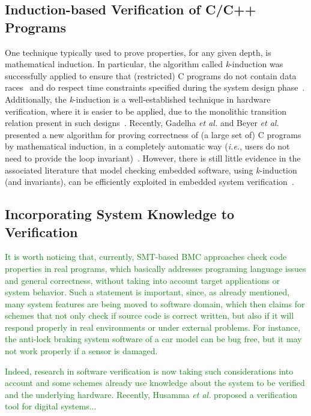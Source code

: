 \documentclass{acm_sen_article}
\begin{document}
\subsection{Induction-based Verification of C/C++ Programs}

One technique typically used to prove properties, for any given depth, is mathematical induction. In particular, the algorithm called \textit{k}-induction was successfully applied to ensure that (restricted) C programs do not contain data races~\cite{Donaldson10,Kinductor} and do respect time constraints specified during the system design phase~\cite{EenS03}. Additionally, the \textit{k}-induction is a well-established technique in hardware verification, where it is easier to be applied, due to the monolithic transition relation present in such designs~\cite{EenS03,GrosseLD09,Sheera00}. Recently, Gadelha {\it et al.} and Beyer {\it et al.} presented a new algorithm for proving correctness of (a large set of) C programs by mathematical induction, in a completely automatic way ({\it i.e.}, users do not need to provide the loop invariant)~\cite{Gadelha15,Beyer15}. However, there is still little evidence in the associated literature that model checking embedded software, using \textit{k}-induction (and invariants), can be efficiently exploited in embedded system verification~\cite{Rocha15}.

\subsection{Incorporating System Knowledge to Verification}

\textcolor{green}{It is worth noticing that, currently, SMT-based BMC approaches check code properties in real programs, which basically addresses programing language issues and general correctness, without taking into account target applications or system behavior. Such a statement is important, since, as already mentioned, many system features are being moved to software domain, which then claims for schemes that not only check if source code is correct written, but also if it will respond properly in real environments or under external problems. For instance, the anti-lock braking system software of a car model can be bug free, but it may not work properly if a sensor is damaged.}

\textcolor{green}{Indeed, research in software verification is now taking such considerations into account and some schemes already use knowledge about the system to be verified and the underlying hardware. Recently, Husamma {\it et al.} proposed a verification tool for digital systems...}
\end{document}

